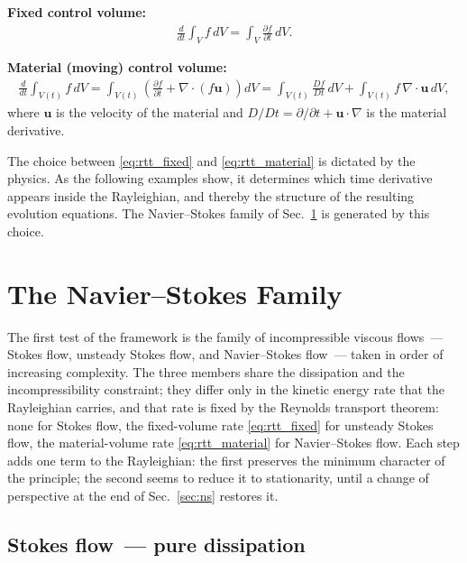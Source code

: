 \documentclass[aip,pof,reprint,amsmath,amssymb,longbibliography]{revtex4-2}
\begin{document}
\textbf{Fixed control volume:}
\begin{align}
    \frac{d}{dt}\int_V f \, dV = \int_V \frac{\partial f}{\partial t} \, dV. \label{eq:rtt_fixed}
\end{align}

\textbf{Material (moving) control volume:}
\begin{align}
    \frac{d}{dt}\int_{V(t)} f \, dV = \int_{V(t)} \left( \frac{\partial f}{\partial t} + \nabla \cdot (f \boldsymbol{u}) \right) dV = \int_{V(t)} \frac{Df}{Dt} \, dV + \int_{V(t)} f \, \nabla \cdot \boldsymbol{u} \, dV, \label{eq:rtt_material}
\end{align}
where $\boldsymbol{u}$ is the velocity of the material and $D/Dt = \partial/\partial t + \boldsymbol{u} \cdot \nabla$ is the material derivative.

The choice between \eqref{eq:rtt_fixed} and \eqref{eq:rtt_material} is dictated by the physics. As the following examples show, it determines which time derivative appears inside the Rayleighian, and thereby the structure of the resulting evolution equations. The Navier--Stokes family of Sec.~\ref{sec:nsfamily} is generated by this choice.


\section{The Navier--Stokes Family}
\label{sec:nsfamily}

The first test of the framework is the family of incompressible viscous flows~--- Stokes flow, unsteady Stokes flow, and Navier--Stokes flow~--- taken in order of increasing complexity. The three members share the dissipation and the incompressibility constraint; they differ only in the kinetic energy rate that the Rayleighian carries, and that rate is fixed by the Reynolds transport theorem: none for Stokes flow, the fixed-volume rate \eqref{eq:rtt_fixed} for unsteady Stokes flow, the material-volume rate \eqref{eq:rtt_material} for Navier--Stokes flow. Each step adds one term to the Rayleighian: the first preserves the minimum character of the principle; the second seems to reduce it to stationarity, until a change of perspective at the end of Sec.~\ref{sec:ns} restores it.

\subsection{Stokes flow~--- pure dissipation}
\label{sec:stokes}
\end{document}
